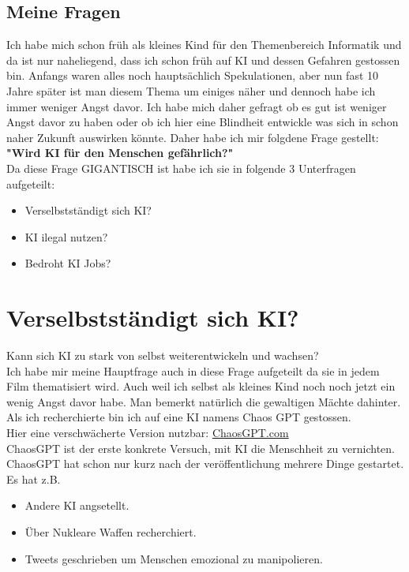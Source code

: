 \subsection{Meine Fragen}
Ich habe mich schon früh als kleines Kind für den Themenbereich Informatik und da ist nur naheliegend, dass ich schon früh auf KI und dessen Gefahren gestossen bin.
Anfangs waren alles noch hauptsächlich Spekulationen, aber nun fast 10 Jahre später ist man diesem Thema um einiges näher und dennoch habe ich immer weniger Angst davor.
Ich habe mich daher gefragt ob es gut ist weniger Angst davor zu haben oder ob ich hier eine Blindheit entwickle was sich in schon naher Zukunft auswirken könnte.
Daher habe ich mir folgdene Frage gestellt: \textbf{"Wird KI für den Menschen gefährlich?"}
\\
Da diese Frage GIGANTISCH ist habe ich sie in folgende 3 Unterfragen aufgeteilt:
\begin{itemize}
    \item Verselbstständigt sich KI?
    \item KI ilegal nutzen?
    \item Bedroht KI Jobs?
\end{itemize}


\newpage
\section{Verselbstständigt sich KI?}
Kann sich KI zu stark von selbst weiterentwickeln und wachsen?
\\
Ich habe mir meine Hauptfrage auch in diese Frage aufgeteilt da sie in jedem Film thematisiert wird. 
Auch weil ich selbst als kleines Kind noch noch jetzt ein wenig Angst davor habe. 
Man bemerkt natürlich die gewaltigen Mächte dahinter. Als ich recherchierte bin ich auf eine KI namens Chaos GPT gestossen.
\\
Hier eine verschwächerte Version nutzbar: \href{https://flowgpt.com/p/chaosgpt}{ChaosGPT.com}
\\
ChaosGPT ist der erste konkrete Versuch, mit KI die Menschheit zu vernichten. \citep{the-decoder}
ChaosGPT hat schon nur kurz nach der veröffentlichung mehrere Dinge gestartet. Es hat z.B.
\begin{itemize}
    \item Andere KI angsetellt.
    \item Über Nukleare Waffen recherchiert.
    \item Tweets geschrieben um Menschen emozional zu manipolieren.
\end{itemize}

